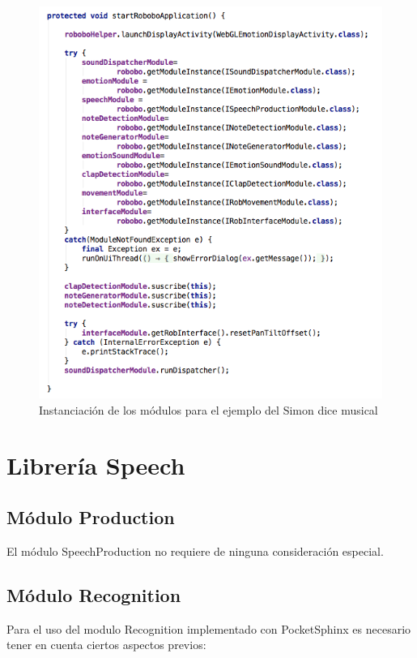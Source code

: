 \begin{figure}
	\centering
	\includegraphics[width=1\linewidth]{imagenes/moduleinstantiation.png}
	\caption{Instanciación de los módulos para el ejemplo del Simon dice musical}
	\label{fig:module-instantiation}
\end{figure}


\section{Librería Speech}
\subsection{Módulo Production}
\label{manual:speechproduction}

El módulo SpeechProduction no requiere de ninguna consideración especial.

\subsection{Módulo Recognition}
\label{manual:speechrecognition}

Para el uso del modulo Recognition implementado con PocketSphinx es necesario tener en cuenta ciertos aspectos previos:

